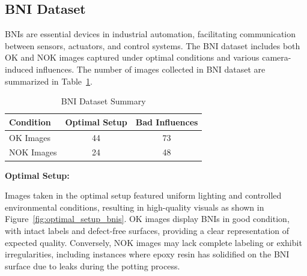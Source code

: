 \documentclass[12pt,DIV14,BCOR12mm,a4paper,footinclude=false,headinclude,parskip=half-,twoside,openright,cleardoublepage=empty,toc=index,bibliography=totoc,listof=totoc]{scrreprt}
\numberwithin{equation}{chapter}
\begin{document}
\subsection{BNI Dataset}
BNIs are essential devices in industrial automation, facilitating communication between sensors, actuators, and control systems. The BNI dataset includes both OK and NOK images captured under optimal conditions and various camera-induced influences. The number of images collected in BNI dataset are summarized in Table~\ref{tab:bni-dataset}.

\begin{table}
    \centering
    \caption{BNI Dataset Summary}
    \label{tab:bni-dataset}
    \begin{tabular}{lcc}
        \toprule
        \textbf{Condition} & \textbf{Optimal Setup} & \textbf{Bad Influences} \\ 
        \midrule
        OK Images          & 44                     & 73                      \\ 
        NOK Images         & 24                     & 48                      \\ 
        \bottomrule
    \end{tabular}
\end{table}


\textbf{Optimal Setup:}

Images taken in the optimal setup featured uniform lighting and controlled environmental conditions, resulting in high-quality visuals as shown in Figure~\ref{fig:optimal_setup_bnis}. OK images display BNIs in good condition, with intact labels and defect-free surfaces, providing a clear representation of expected quality. Conversely, NOK images may lack complete labeling or exhibit irregularities, including instances where epoxy resin has solidified on the BNI surface due to leaks during the potting process.
\end{document}
